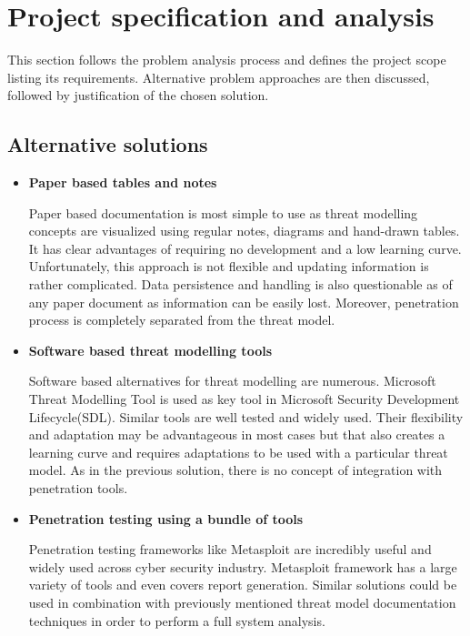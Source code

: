 \section{Project specification and analysis}
This section follows the problem analysis process and defines the project scope listing its requirements. Alternative problem approaches are then discussed, followed by justification of the chosen solution.

\subsection{Alternative solutions}

	\begin{itemize}
		\item \textbf{Paper based tables and notes}
		
		Paper based documentation is most simple to use as threat modelling concepts are visualized using regular notes, diagrams and hand-drawn tables. It has clear advantages of requiring no development and a low learning curve. Unfortunately, this approach is not flexible and updating information is rather complicated. Data persistence and handling is also questionable as of any paper document as information can be easily lost. Moreover, penetration process is completely separated from the threat model.
		
		\item \textbf{Software based threat modelling tools}
		
		Software based alternatives for threat modelling are numerous. Microsoft Threat Modelling Tool is used as key tool in Microsoft Security Development Lifecycle(SDL)\cite{mic-threat-model}. Similar tools are well tested and widely used. Their flexibility and adaptation may be advantageous in most cases but that also creates a learning curve and requires adaptations to be used with a particular threat model. As in the previous solution, there is no concept of integration with penetration tools.
				
		\item \textbf{Penetration testing using a bundle of tools}
		
		Penetration testing frameworks like Metasploit are incredibly useful and widely used across cyber security industry. Metasploit framework has a large variety of tools and even covers report generation. Similar solutions could be used in combination with previously mentioned threat model documentation techniques in order to perform a full system analysis.
		
	\end{itemize}

